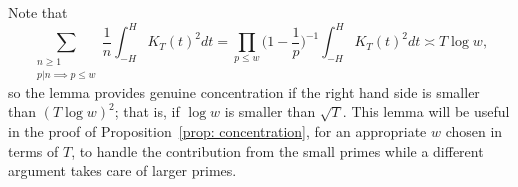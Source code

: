 \documentclass[12pt, notitlepage]{amsart}
\numberwithin{equation}{section}
\theoremstyle{remark}
\theoremstyle{definition}
\theoremstyle{remark}
\numberwithin{equation}{section}
\begin{document}
Note that 
$$
\sum_{\substack{n\ge 1\\  p|n \implies p\le w}} \frac{1}{n} \int_{-H}^{H} K_T(t)^{2}  dt  = \prod_{p \leq w} \Big(1 - \frac{1}{p}\Big)^{-1} \int_{-H}^{H} K_T(t)^{2}  dt \asymp T\log w,
$$
 so the lemma provides genuine concentration if the right hand side is smaller than $(T\log w)^2$; that is,  if $\log w$ is smaller than $\sqrt{T}$.  This lemma will be useful in the proof of Proposition~\ref{prop: concentration}, for an appropriate  $w$ chosen in terms of $T$, to handle the contribution from the small primes while a different argument takes care of larger primes. %
\end{document}
